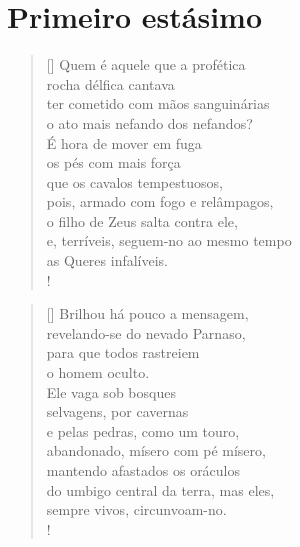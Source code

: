 
\section{Primeiro estásimo}



\settowidth{\versewidth}{e, terríveis, seguem-no ao mesmo tempo}
\begin{verse}[\versewidth]
Quem é aquele que a profética\\ 
rocha délfica cantava\\
ter cometido com mãos sanguinárias\\
o ato mais nefando dos nefandos?\\
É hora de mover em fuga\\
os pés com mais força\\
que os cavalos tempestuosos,\\
pois, armado com fogo e relâmpagos,\\
o filho de Zeus salta contra ele,\\
e, terríveis, seguem-no ao mesmo tempo\\
as Queres infalíveis.\\!
\end{verse}

\settowidth{\versewidth}{e, terríveis, seguem-no ao mesmo tempo}
\begin{verse}[\versewidth]
Brilhou há pouco a mensagem,\\ 
revelando-se do nevado Parnaso,\\
para que todos rastreiem\\
o homem oculto.\\
Ele vaga sob bosques\\
selvagens, por cavernas\\
e pelas pedras, como um touro,\\
abandonado, mísero com pé mísero,\\
mantendo afastados os oráculos\\
do umbigo central da terra, mas eles,\\
sempre vivos, circunvoam-no.\\!
\end{verse} 

